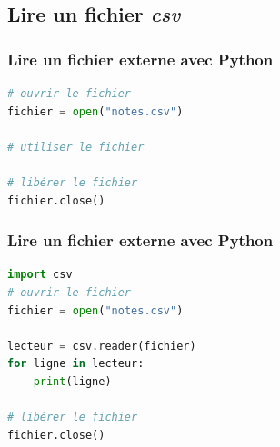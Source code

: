 \documentclass[svgnames,11pt]{beamer}
\begin{document}
\subsection{Lire un fichier \emph{csv}}
\begin{frame}[fragile]
    \frametitle{Lire un fichier externe avec Python}

    \begin{center}
        \begin{lstlisting}[language=Python]
# ouvrir le fichier
fichier = open("notes.csv")

# utiliser le fichier

# libérer le fichier
fichier.close()
    \end{lstlisting}
        \label{iterer}
    \end{center}
\end{frame}

\begin{frame}[fragile]
    \frametitle{Lire un fichier externe avec Python}

    \begin{center}
        \begin{lstlisting}[language=Python]
import csv
# ouvrir le fichier
fichier = open("notes.csv")

lecteur = csv.reader(fichier)
for ligne in lecteur:
    print(ligne)

# libérer le fichier
fichier.close()
    \end{lstlisting}
        \label{iterer}
    \end{center}
\end{frame}
\end{document}
